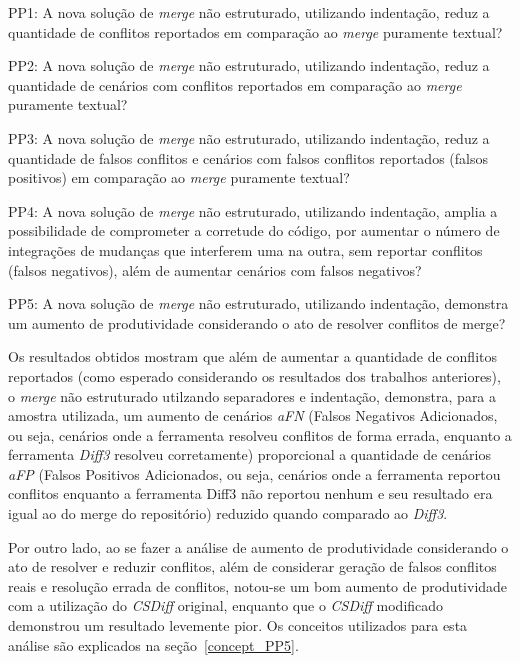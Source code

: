 \begin{compactenum}[1)]
	\item PP1: A nova solução de \emph{merge} não estruturado, utilizando indentação,
	reduz a quantidade de conflitos reportados em comparação ao \emph{merge} puramente textual?
	\item PP2: A nova solução de \emph{merge} não estruturado, utilizando indentação,
	reduz a quantidade de cenários com conflitos reportados em comparação ao \emph{merge} puramente textual?
	\item PP3: A nova solução de \emph{merge} não estruturado, utilizando indentação,
	reduz a quantidade de falsos conflitos e cenários com falsos conflitos reportados
	(falsos positivos) em comparação ao \emph{merge} puramente textual?
	\item PP4: A nova solução de \emph{merge} não estruturado, utilizando indentação,
	amplia a possibilidade de comprometer a corretude do código, por aumentar o número de
	integrações de mudanças que interferem uma na outra, sem reportar conflitos (falsos negativos),
	além de aumentar cenários com falsos negativos?
	\item PP5: A nova solução de \emph{merge} não estruturado, utilizando indentação,
	demonstra um aumento de produtividade considerando o ato de resolver conflitos de merge?
\end{compactenum}

Os resultados obtidos mostram que além de aumentar a quantidade de conflitos
reportados (como esperado considerando os resultados dos trabalhos anteriores),
o \emph{merge} não estruturado utilzando separadores e indentação, demonstra,
para a amostra utilizada, um aumento de cenários \emph{aFN} (Falsos Negativos
Adicionados, ou seja, cenários onde a ferramenta resolveu conflitos de forma
errada, enquanto a ferramenta \emph{Diff3} resolveu corretamente) proporcional
a quantidade de cenários \emph{aFP} (Falsos Positivos Adicionados, ou seja,
cenários onde a ferramenta reportou conflitos enquanto a ferramenta Diff3 não
reportou nenhum e seu resultado era igual ao do merge do repositório) reduzido
quando comparado ao \emph{Diff3}.

Por outro lado, ao se fazer a análise de aumento de produtividade considerando
o ato de resolver e reduzir conflitos, além de considerar geração de falsos
conflitos reais e resolução errada de conflitos, notou-se um bom aumento de
produtividade com a utilização do \emph{CSDiff} original, enquanto que o
\emph{CSDiff} modificado demonstrou um resultado levemente pior. Os conceitos
utilizados para esta análise são explicados na seção~\ref{concept_PP5}.

